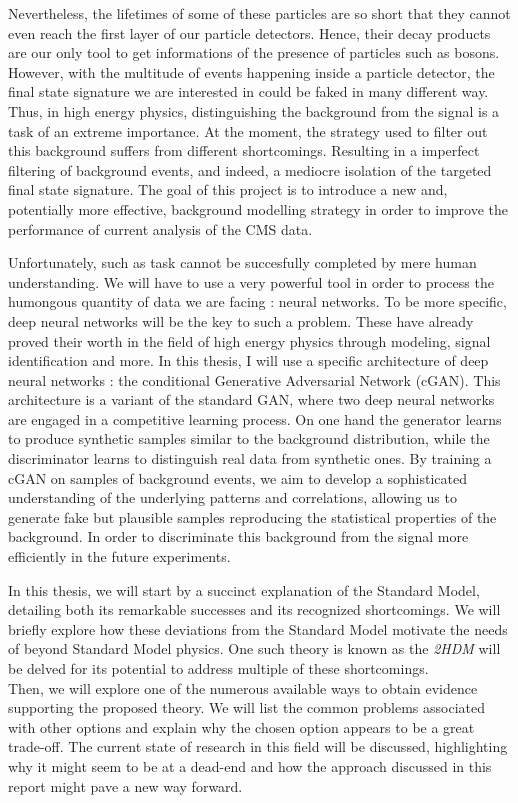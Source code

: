 \documentclass [12pt] {article}
\numberwithin{equation}{section} %
\numberwithin{figure}{section}   %
\begin{document}
Nevertheless, the lifetimes of some of these particles are so short that they cannot even reach the first layer of our particle detectors. Hence, their decay products are our only tool to get informations of the presence of particles such as bosons. However, with the multitude of events happening inside a particle detector, the final state signature we are interested in could be faked in many different way. Thus, in high energy physics, distinguishing the background from the signal is a task of an extreme importance. At the moment, the strategy used to filter out this background suffers from different shortcomings. Resulting in a imperfect filtering of background events, and indeed, a mediocre isolation of the targeted final state signature. The goal of this project is to introduce a new and, potentially more effective, background modelling strategy in order to improve the performance of current analysis of the CMS data.

Unfortunately, such as task cannot be succesfully completed by mere human understanding. We will have to use a very powerful tool in order to process the humongous quantity of data we are facing : neural networks. To be more specific, deep neural networks will be the key to such a problem. These have already proved their worth in the field of high energy physics through modeling, signal identification and more. In this thesis, I will use a specific architecture of deep neural networks : the conditional Generative Adversarial Network (cGAN). This architecture is a variant of the standard GAN, where two deep neural networks are engaged in a competitive learning process. On one hand the generator learns to produce synthetic samples similar to the background distribution, while the discriminator learns to distinguish real data from synthetic ones. By training a cGAN on samples of background events, we aim to develop a sophisticated understanding of the underlying patterns and correlations, allowing us to generate fake but plausible samples reproducing the statistical properties of the background. In order to discriminate this background from the signal more efficiently in the future experiments.

In this thesis, we will start by a succinct explanation of the Standard Model, detailing both its remarkable successes and its recognized shortcomings. We will briefly explore how these deviations from the Standard Model motivate the needs of beyond Standard Model physics. One such theory is known as the \textit{2HDM} will be delved for its potential to address multiple of these shortcomings.\\
Then, we will explore one of the numerous available ways to obtain evidence supporting the proposed theory. We will list the common problems associated with other options and explain why the chosen option appears to be a great trade-off. The current state of research in this field will be discussed, highlighting why it might seem to be at a dead-end and how the approach discussed in this report might pave a new way forward.\\ 
\end{document}
